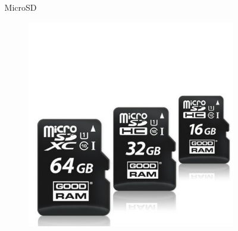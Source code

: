 \documentclass[]{beamer}
\begin{document}
\begin{frame}
\begin{columns}
\begin{column}{.3\textwidth}
\begin{center}
\begin{figure}
    \end{figure}
  \end{center}
\end{column}
\begin{column}{.3\textwidth}
  \begin{center}
    MicroSD
    \begin{figure}
      \includegraphics[width=\columnwidth]{img/microsd.jpg}
    \end{figure}
  \end{center}
\end{column}
\end{columns}
\end{frame}
\end{document}
